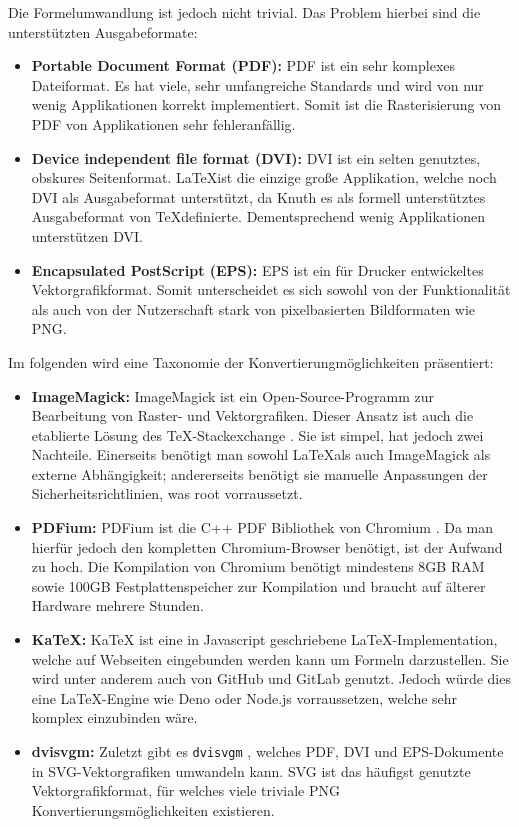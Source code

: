 \documentclass[ngerman]{article}
\begin{document}
Die Formelumwandlung ist jedoch nicht trivial. Das Problem hierbei sind die unterstützten Ausgabeformate:
\begin{itemize}
  \item \textbf{Portable Document Format (PDF):} PDF ist ein sehr komplexes Dateiformat. Es hat viele, sehr umfangreiche Standards und wird von nur wenig Applikationen korrekt implementiert. Somit ist die Rasterisierung von PDF von Applikationen sehr fehleranfällig.
  \item \textbf{Device independent file format (DVI):} DVI ist ein selten genutztes, obskures Seitenformat. \LaTeX ist die einzige große Applikation, welche noch DVI als Ausgabeformat unterstützt, da Knuth es als formell unterstütztes Ausgabeformat von \TeX definierte. Dementsprechend wenig Applikationen unterstützen DVI.
  \item \textbf{Encapsulated PostScript (EPS):} EPS ist ein für Drucker entwickeltes Vektorgrafikformat. Somit unterscheidet es sich sowohl von der Funktionalität als auch von der Nutzerschaft stark von pixelbasierten Bildformaten wie PNG.
\end{itemize}

Im folgenden wird eine Taxonomie der Konvertierungmöglichkeiten präsentiert:
\begin{itemize}
  \item \textbf{ImageMagick:} ImageMagick \cite{ImageMagick} ist ein Open-Source-Programm zur Bearbeitung von Raster- und Vektorgrafiken. Dieser Ansatz ist auch die etablierte Lösung des \TeX-Stackexchange \cite{TeXStackexchange}. Sie ist simpel, hat jedoch zwei Nachteile. Einerseits benötigt man sowohl \LaTeX als auch ImageMagick als externe Abhängigkeit; andererseits benötigt sie manuelle Anpassungen der Sicherheitsrichtlinien, was root vorraussetzt.
  \item \textbf{PDFium:} PDFium \cite{PDFium} ist die C++ PDF Bibliothek von Chromium \cite{Chromium}. Da man hierfür jedoch den kompletten Chromium-Browser benötigt, ist der Aufwand zu hoch. Die Kompilation von Chromium benötigt mindestens 8GB RAM sowie 100GB Festplattenspeicher zur Kompilation und braucht auf älterer Hardware mehrere Stunden.
  \item \textbf{KaTeX:} KaTeX \cite{KaTeX} ist eine in Javascript geschriebene \LaTeX-Implementation, welche auf Webseiten eingebunden werden kann um Formeln darzustellen. Sie wird unter anderem auch von GitHub und GitLab genutzt. Jedoch würde dies eine LaTeX-Engine wie Deno \cite{Deno} oder Node.js \cite{Node} vorraussetzen, welche sehr komplex einzubinden wäre.
  \item \textbf{dvisvgm:} Zuletzt gibt es \texttt{dvisvgm} \cite{dvisvgm}, welches PDF, DVI und EPS-Dokumente in SVG-Vektorgrafiken umwandeln kann. SVG ist das häufigst genutzte Vektorgrafikformat, für welches viele triviale PNG Konvertierungsmöglichkeiten existieren.
\end{itemize}
\end{document}
